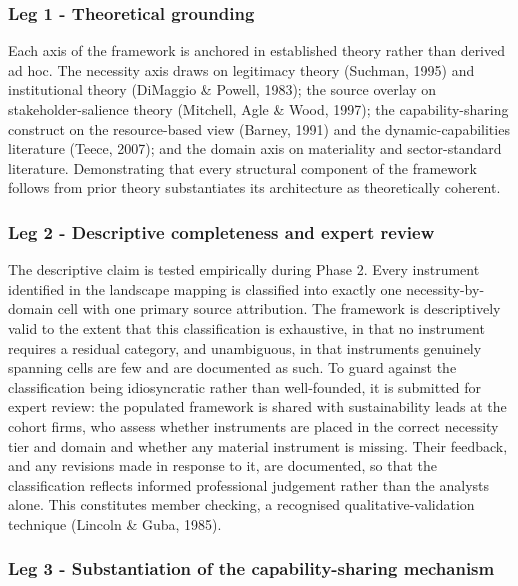 \documentclass[
]{article}
\begin{document}
\subsubsection{Leg 1 - Theoretical
grounding}\label{leg-1---theoretical-grounding}

Each axis of the framework is anchored in established theory rather than
derived ad hoc. The necessity axis draws on legitimacy theory (Suchman,
1995) and institutional theory (DiMaggio \& Powell, 1983); the source
overlay on stakeholder-salience theory (Mitchell, Agle \& Wood, 1997);
the capability-sharing construct on the resource-based view (Barney,
1991) and the dynamic-capabilities literature (Teece, 2007); and the
domain axis on materiality and sector-standard literature. Demonstrating
that every structural component of the framework follows from prior
theory substantiates its architecture as theoretically coherent.

\subsubsection{Leg 2 - Descriptive completeness and expert
review}\label{leg-2---descriptive-completeness-and-inter-coder-reliability}

The descriptive claim is tested empirically during Phase 2. Every
instrument identified in the landscape mapping is classified into
exactly one necessity-by-domain cell with one primary source
attribution. The framework is descriptively valid to the extent that
this classification is exhaustive, in that no instrument requires a
residual category, and unambiguous, in that instruments genuinely
spanning cells are few and are documented as such. To guard against the
classification being idiosyncratic rather than well-founded, it is submitted
for expert review: the populated framework is shared with sustainability
leads at the cohort firms, who assess whether instruments are placed in the
correct necessity tier and domain and whether any material instrument is
missing. Their feedback, and any revisions made in response to it, are
documented, so that the classification reflects informed professional
judgement rather than the analyst\textquotesingle s alone. This constitutes
member checking, a recognised qualitative-validation technique (Lincoln \&
Guba, 1985).

\subsubsection{Leg 3 - Substantiation of the capability-sharing
mechanism}\label{leg-3---substantiation-of-the-capability-sharing-mechanism}
\end{document}
